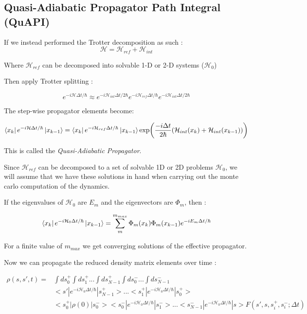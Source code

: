 \subsection{Quasi-Adiabatic Propagator Path Integral (QuAPI)}

 If we instead performed the Trotter decomposition as such : 
 \begin{equation}
\mathcal{H} = \mathcal{H}_{ref} + \mathcal{H}_{int}
 \end{equation}

Where $\mathcal{H}_{ref}$ can be decomposed into solvable 1-D or 2-D systems ($\mathcal{H}_0$) 

Then apply Trotter splitting : 

\begin{equation}
e^{-i \mathcal{H} \Delta t /\hbar} \approx e^{-i\mathcal{H}_{int}\Delta t / 2\hbar}e^{-i\mathcal{H}_{ref}\Delta t / \hbar}e^{-i\mathcal{H}_{int}\Delta t / 2\hbar}
\end{equation}

The step-wise propagator elements become:

\begin{equation}
\bra{x_k}e^{-i \mathcal{H} \Delta t / \hbar} \ket{x_{k-1}} = \bra{x_k}e^{-i \mathcal{H}_{ref} \Delta t / \hbar}\ket{x_{k-1}}  \exp(\frac{-i \Delta t}{2 \hbar}(\mathcal{H}_{int}(x_k) + \mathcal{H}_{int}(x_{k-1})))
\end{equation}

This is called the \emph{Quasi-Adiabatic Propagator}.

Since $\mathcal{H}_{ref}$ can be decomposed to a set of solvable 1D or 2D problems $\mathcal{H}_0$, we will assume that we have these solutions in hand when carrying out the monte carlo computation of the dynamics.


If the eigenvalues of $\mathcal{H}_0$ are $E_m$ and the eigenvectors are $\Phi_m$, then :

\begin{equation}
\bra{x_k}e^{-i \mathcal{H}_{0} \Delta t / \hbar}\ket{x_{k-1}} = \sum_{m}^{m_{max}} \Phi_m (x_k) \Phi_m(x_{k-1}) e^{-iE_{m}\Delta t / \hbar}
\end{equation}

For a finite value of $m_{max}$ we get converging solutions of the effective propagator.

Now we can propagate the reduced density matrix elements over time :

\begin{equation}
\begin{split}
\rho(s, s', t) = & \int ds_0^{+} \int ds_1^{+} ... \int ds_{N-1}^{+} \int ds_{0}^{-} ... \int ds_{N-1}^{-} \\ &  <s'|e^{-i \mathscr{H}_{0} \Delta t / \hbar}|s_{N-1}^{+}> ... <s_1^{+}|e^{-i \mathscr{H}_{0} \Delta t / \hbar}|s_0^{+}> \\ & <s_0^{+}|\rho(0)|s_0^{-}> <s_0^{-}|e^{-i \mathscr{H}_{0} \Delta t / \hbar}|s_1^{-}> ...<s_{N-1}^{-}|e^{-i \mathscr{H}_{0} \Delta t / \hbar}|s>F(s', s, s_i^{+}, s_i^{-} ; \Delta t)
\end{split}
\end{equation}

